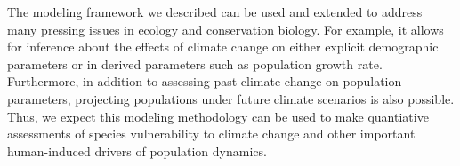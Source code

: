 \documentclass[12pt]{article}
\begin{document}

The modeling framework we described can be used and extended to address many
pressing issues in ecology and conservation biology. For
example,
it allows for inference %
about the effects of climate change on either explicit
demographic parameters or in derived parameters such as
population growth rate. Furthermore, %
in addition to assessing past climate change on population
parameters, projecting populations under future climate scenarios is also
possible. Thus, we expect this modeling methodology can be used
to make quantiative assessments of species vulnerability to climate
change and other important human-induced drivers of population
dynamics.
\end{document}
